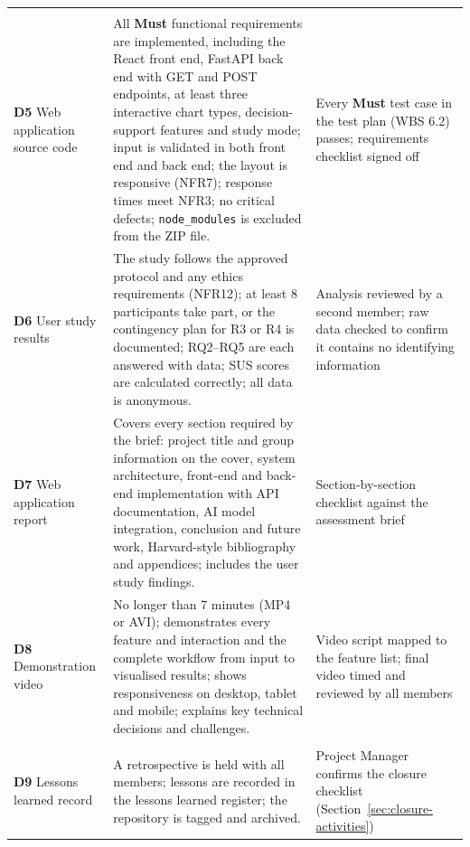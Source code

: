 {\begin{longtable}{@{}>{\raggedright\arraybackslash}p{} >{\raggedright\arraybackslash}p{} >{\raggedright\arraybackslash}p{}@{}}
  \multicolumn{3}{@{}l}{\cellcolor{brandprimary!8}\textbf{\sffamily Assignment 3 -- due Sun 6 Dec}} \\
  \textbf{D5} Web application source code &
  All \textbf{Must} functional requirements are implemented, including the React front end, FastAPI back end with GET and POST endpoints, at least three interactive chart types, decision-support features and study mode; input is validated in both front end and back end; the layout is responsive (NFR7); response times meet NFR3; no critical defects; \texttt{node\_modules} is excluded from the ZIP file. &
  Every \textbf{Must} test case in the test plan (WBS 6.2) passes; requirements checklist signed off \\
  \addlinespace
  \textbf{D6} User study results &
  The study follows the approved protocol and any ethics requirements (NFR12); at least 8 participants take part, or the contingency plan for R3 or R4 is documented; RQ2--RQ5 are each answered with data; SUS scores are calculated correctly; all data is anonymous. &
  Analysis reviewed by a second member; raw data checked to confirm it contains no identifying information \\
  \addlinespace
  \textbf{D7} Web application report &
  Covers every section required by the brief: project title and group information on the cover, system architecture, front-end and back-end implementation with API documentation, AI model integration, conclusion and future work, Harvard-style bibliography and appendices; includes the user study findings. &
  Section-by-section checklist against the assessment brief \\
  \addlinespace
  \textbf{D8} Demonstration video &
  No longer than 7 minutes (MP4 or AVI); demonstrates every feature and interaction and the complete workflow from input to visualised results; shows responsiveness on desktop, tablet and mobile; explains key technical decisions and challenges. &
  Video script mapped to the feature list; final video timed and reviewed by all members \\

  \multicolumn{3}{@{}l}{\cellcolor{brandprimary!8}\textbf{\sffamily Closure -- Tue 8 Dec}} \\
  \textbf{D9} Lessons learned record &
  A retrospective is held with all members; lessons are recorded in the lessons learned register; the repository is tagged and archived. &
  Project Manager confirms the closure checklist (Section~\ref{sec:closure-activities}) \\
\end{longtable}
}


